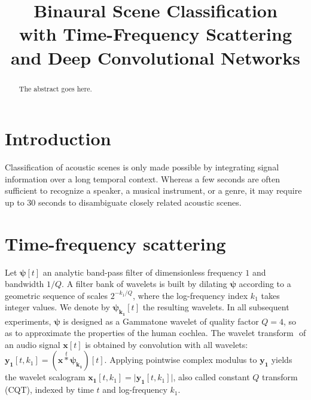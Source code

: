 \documentclass[conference]{IEEEtran}
\begin{document}
\title{
Binaural Scene Classification \\
with Time-Frequency Scattering \\
and Deep Convolutional Networks}

\author{
}
\maketitle

\begin{abstract}
The abstract goes here.
\end{abstract}
\IEEEpeerreviewmaketitle

\section{Introduction}
Classification of acoustic scenes is only made possible by integrating
signal information over a long temporal context.
Whereas a few seconds are often sufficient to recognize a speaker,
a musical instrument, or a genre, it may require up to 30 seconds
to disambiguate closely related acoustic scenes.


\section{Time-frequency scattering}
Let $\boldsymbol{\psi}[t]$ an analytic band-pass filter of
dimensionless frequency $1$ and bandwidth $1/Q$.
A filter bank of wavelets is built by dilating $\boldsymbol{\psi}$
according to a geometric sequence of scales $2^{-k_1/Q}$, where the
log-frequency index $k_1$ takes integer values.
We denote by $\boldsymbol{\psi_{k_1}}[t]$ the resulting wavelets.
In all subsequent experiments,
$\boldsymbol{\psi}$ is designed as a Gammatone
wavelet of quality factor $Q = 4$, so as to approximate the properties of
the human cochlea.
The wavelet transform $\boldsymbol{}$ of an audio signal
$\boldsymbol{x}[t]$ is obtained by convolution with all wavelets:
$\boldsymbol{y_1}[t, k_1] =
(\boldsymbol{x} \overset{t}{\ast} \boldsymbol{\psi_{k_1}})[t]$.
Applying pointwise complex modulus to $\boldsymbol{y_1}$ yields
the wavelet scalogram
$\boldsymbol{x_1}[t, k_1]
= \vert \boldsymbol{y_1}[t, k_1] \vert$,
also called constant $Q$ transform (CQT),
indexed by time $t$ and log-frequency $k_1$.
\end{document}
